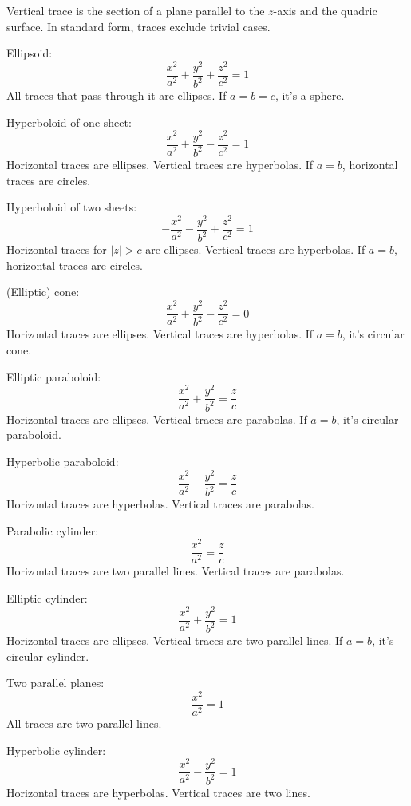 \documentclass[a4paper,12pt]{report}
\begin{document}
Vertical trace is the section of a plane parallel to the $z$-axis and the quadric surface.
In standard form, traces exclude trivial cases.
\bit
\item Ellipsoid:
\[\frac{x^2}{a^2}+\frac{y^2}{b^2}+\frac{z^2}{c^2}=1\]
All traces that pass through it are ellipses. If $a=b=c$, it's a sphere.
\item Hyperboloid of one sheet:
\[\frac{x^2}{a^2}+\frac{y^2}{b^2}-\frac{z^2}{c^2}=1\]
Horizontal traces are ellipses. Vertical traces are hyperbolas. If $a=b$, horizontal traces are circles.
\item Hyperboloid of two sheets:
\[-\frac{x^2}{a^2}-\frac{y^2}{b^2}+\frac{z^2}{c^2}=1\]
Horizontal traces for $|z|>c$ are ellipses. Vertical traces are hyperbolas. If $a=b$, horizontal traces are circles.
\item (Elliptic) cone:
\[\frac{x^2}{a^2}+\frac{y^2}{b^2}-\frac{z^2}{c^2}=0\]
Horizontal traces are ellipses. Vertical traces are hyperbolas. If $a=b$, it's circular cone.
\item Elliptic paraboloid:
\[\frac{x^2}{a^2}+\frac{y^2}{b^2}=\frac{z}{c}\]
Horizontal traces are ellipses. Vertical traces are parabolas. If $a=b$, it's circular paraboloid.
\item Hyperbolic paraboloid:
\[\frac{x^2}{a^2}-\frac{y^2}{b^2}=\frac{z}{c}\]
Horizontal traces are hyperbolas. Vertical traces are parabolas.
\item Parabolic cylinder:
\[\frac{x^2}{a^2}=\frac{z}{c}\]
Horizontal traces are two parallel lines. Vertical traces are parabolas.
\item Elliptic cylinder:
\[\frac{x^2}{a^2}+\frac{y^2}{b^2}=1\]
Horizontal traces are ellipses. Vertical traces are two parallel lines. If $a=b$, it's circular cylinder.
\item Two parallel planes:
\[\frac{x^2}{a^2}=1\]
All traces are two parallel lines.
\item Hyperbolic cylinder:
\[\frac{x^2}{a^2}-\frac{y^2}{b^2}=1\]
Horizontal traces are hyperbolas. Vertical traces are two lines.
\eit
\end{document}
